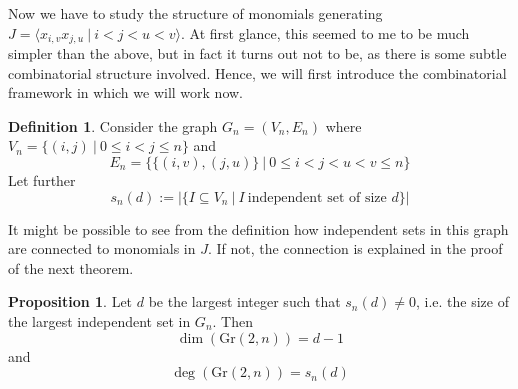\documentclass{scrartcl}
\newcommand{\Gr}{\mathrm{Gr}}
\theoremstyle{definition}
\newtheorem{definition}[subsection]{Definition}
\newtheorem{proposition}[subsection]{Proposition}
\begin{document}
Now we have to study the structure of monomials generating $J = \langle x_{i, v} x_{j, u} \ | \ i < j < u < v \rangle$.
At first glance, this seemed to me to be much simpler than the above, but in fact it turns out not to be, as there is some subtle combinatorial structure involved.
Hence, we will first introduce the combinatorial framework in which we will work now.
\begin{definition}
    Consider the graph $G_n = (V_n, E_n)$ where $V_n = \{ (i, j) \ | \ 0 \leq i < j \leq n \}$ and
    \begin{equation*}
        E_n = \{ \{ (i, v), (j, u) \} \ | \ 0 \leq i < j < u < v \leq n \}
    \end{equation*}
    Let further
    \begin{equation*}
        s_n(d) := |\{ I \subseteq V_n \ | \ I \ \text{independent set of size $d$}\}|
    \end{equation*}
\end{definition}
It might be possible to see from the definition how independent sets in this graph are connected to monomials in $J$.
If not, the connection is explained in the proof of the next theorem.
\begin{proposition}
    Let $d$ be the largest integer such that $s_n(d) \neq 0$, i.e. the size of the largest independent set in $G_n$.
    Then
    \begin{equation*}
        \dim(\Gr(2, n)) = d - 1
    \end{equation*}
    and
    \begin{equation*}
        \deg(\Gr(2, n)) = s_n(d)
    \end{equation*}
\end{proposition}
\end{document}
